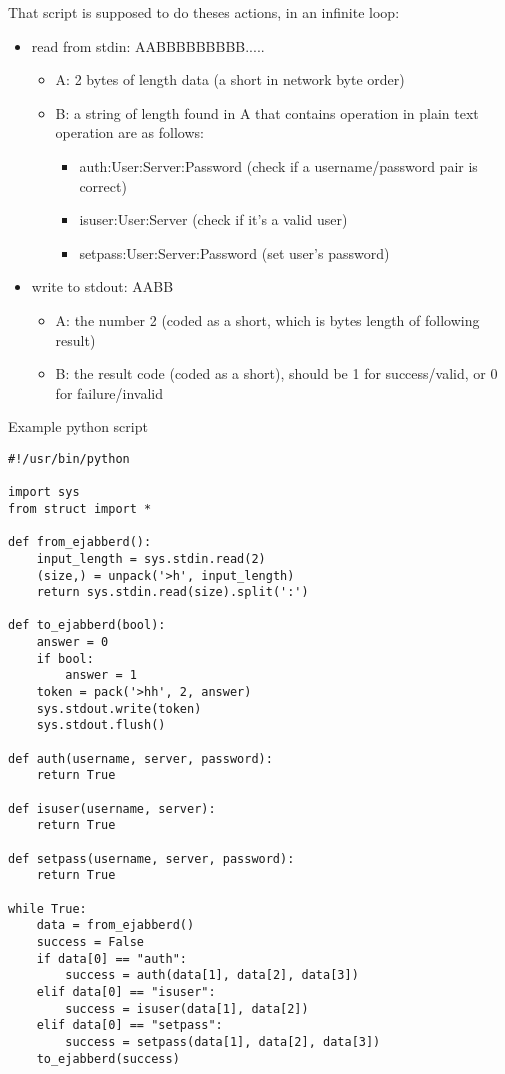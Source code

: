 \documentclass[a4paper,10pt]{article}
\begin{document}
That script is supposed to do theses actions, in an infinite loop:
\begin{itemize}
\item read from stdin: AABBBBBBBBB.....
    \begin{itemize}
    \item A: 2 bytes of length data (a short in network byte order)
    \item B: a string of length found in A that contains operation in plain text
    operation are as follows:
    \begin{itemize}
    \item auth:User:Server:Password (check if a username/password pair is correct)
    \item isuser:User:Server (check if it's a valid user)
    \item setpass:User:Server:Password (set user's password)
    \end{itemize}
    \end{itemize}
\item write to stdout: AABB
    \begin{itemize}
    \item A: the number 2 (coded as a short, which is bytes length of following result)
    \item B: the result code (coded as a short), should be 1 for success/valid, or 0 for failure/invalid
    \end{itemize}
\end{itemize}

Example python script
\begin{verbatim}
#!/usr/bin/python

import sys
from struct import *

def from_ejabberd():
    input_length = sys.stdin.read(2)
    (size,) = unpack('>h', input_length)
    return sys.stdin.read(size).split(':')

def to_ejabberd(bool):
    answer = 0
    if bool:
        answer = 1
    token = pack('>hh', 2, answer)
    sys.stdout.write(token)
    sys.stdout.flush()

def auth(username, server, password):
    return True

def isuser(username, server):
    return True

def setpass(username, server, password):
    return True

while True:
    data = from_ejabberd()
    success = False
    if data[0] == "auth":
        success = auth(data[1], data[2], data[3])
    elif data[0] == "isuser":
        success = isuser(data[1], data[2])
    elif data[0] == "setpass":
        success = setpass(data[1], data[2], data[3])
    to_ejabberd(success)
\end{verbatim}
\end{document}
